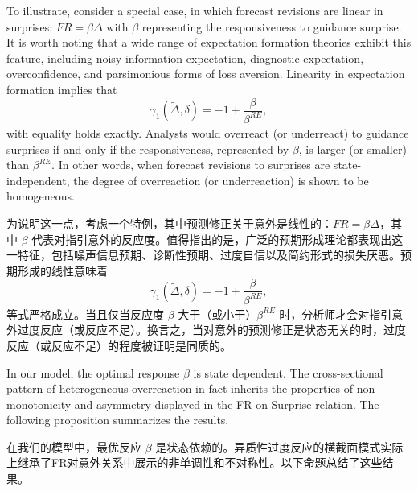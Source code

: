 \documentclass[12pt,a4paper]{article}
\newenvironment{original}
  {\par\medskip\noindent\ignorespaces}
  {\par\medskip}
\newenvironment{translation}
  {\par\noindent{\color{transblue}\ignorespaces}}
  {\par\bigskip}
\begin{document}
\begin{original}
To illustrate, consider a special case, in which forecast revisions are linear in surprises: $FR = \beta \Delta$ with $\beta$ representing the responsiveness to guidance surprise. It is worth noting that a wide range of expectation formation theories exhibit this feature, including noisy information expectation, diagnostic expectation, overconfidence, and parsimonious forms of loss aversion. Linearity in expectation formation implies that
\[
\gamma_1(\tilde{\Delta}, \delta) = -1 + \frac{\beta}{\beta^{RE}},
\]
with equality holds exactly. Analysts would overreact (or underreact) to guidance surprises if and only if the responsiveness, represented by $\beta$, is larger (or smaller) than $\beta^{RE}$. In other words, when forecast revisions to surprises are state-independent, the degree of overreaction (or underreaction) is shown to be homogeneous.
\end{original}
\begin{translation}
为说明这一点，考虑一个特例，其中预测修正关于意外是线性的：$FR = \beta \Delta$，其中 $\beta$ 代表对指引意外的反应度。值得指出的是，广泛的预期形成理论都表现出这一特征，包括噪声信息预期、诊断性预期、过度自信以及简约形式的损失厌恶。预期形成的线性意味着
\[
\gamma_1(\tilde{\Delta}, \delta) = -1 + \frac{\beta}{\beta^{RE}},
\]
等式严格成立。当且仅当反应度 $\beta$ 大于（或小于）$\beta^{RE}$ 时，分析师才会对指引意外过度反应（或反应不足）。换言之，当对意外的预测修正是状态无关的时，过度反应（或反应不足）的程度被证明是同质的。
\end{translation}

\begin{original}
In our model, the optimal response $\beta$ is state dependent. The cross-sectional pattern of heterogeneous overreaction in fact inherits the properties of non-monotonicity and asymmetry displayed in the FR-on-Surprise relation. The following proposition summarizes the results.
\end{original}
\begin{translation}
在我们的模型中，最优反应 $\beta$ 是状态依赖的。异质性过度反应的横截面模式实际上继承了FR对意外关系中展示的非单调性和不对称性。以下命题总结了这些结果。
\end{translation}
\end{document}
